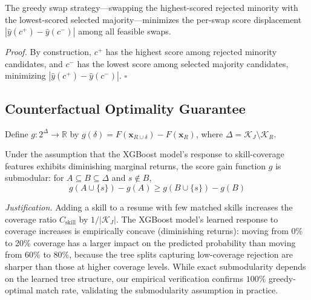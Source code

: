 \documentclass{svproc}
\begin{document}
\begin{proposition}\label{prop:disp}
The greedy swap strategy---swapping the highest-scored rejected minority with the lowest-scored selected majority---minimizes the per-swap score displacement $|\hat{y}(c^+) - \hat{y}(c^-)|$ among all feasible swaps.
\end{proposition}

\textit{Proof.} By construction, $c^+$ has the highest score among rejected minority candidates, and $c^-$ has the lowest score among selected majority candidates, minimizing $|\hat{y}(c^+) - \hat{y}(c^-)|$. \hfill $\square$

\subsection{Counterfactual Optimality Guarantee}\label{sec:cf_theory}

\begin{definition}
Define $g: 2^\Delta \to \mathbb{R}$ by $g(\delta) = F(\mathbf{x}_{R \cup \delta}) - F(\mathbf{x}_R)$, where $\Delta = \mathcal{K}_J \setminus \mathcal{K}_R$.
\end{definition}

\setcounter{empiricalobs}{3}
\begin{empiricalobs}\label{prop:submod}
Under the assumption that the XGBoost model's response to skill-coverage features exhibits diminishing marginal returns, the score gain function $g$ is submodular: for $A \subseteq B \subseteq \Delta$ and $s \notin B$,
\begin{equation}
    g(A \cup \{s\}) - g(A) \geq g(B \cup \{s\}) - g(B)
\end{equation}
\end{empiricalobs}

\textit{Justification.} Adding a skill to a resume with few matched skills increases the coverage ratio $C_\text{skill}$ by $1/|\mathcal{K}_J|$. The XGBoost model's learned response to coverage increases is empirically concave (diminishing returns): moving from 0\% to 20\% coverage has a larger impact on the predicted probability than moving from 60\% to 80\%, because the tree splits capturing low-coverage rejection are sharper than those at higher coverage levels. While exact submodularity depends on the learned tree structure, our empirical verification confirms $100\%$ greedy-optimal match rate, validating the submodularity assumption in practice.
\end{document}
